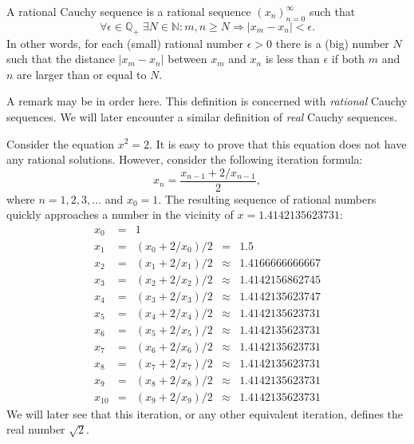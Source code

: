 \documentclass[11pt]{linearbook}
\begin{document}
\begin{definition}
  \label{th:rationalcauchysequence}
  A rational Cauchy sequence is a rational sequence
  $(x_n)_{n=0}^{\infty}$ such that
  \begin{equation}
    \forall \epsilon \in \mathbb{Q}_+ \;
    \exists N \in \mathbb{N} : m, n \geq N \Rightarrow |x_m - x_n| < \epsilon.
  \end{equation}
  In other words, for each (small) rational number $\epsilon > 0$
  there is a (big) number $N$ such that the distance $|x_m - x_n|$
  between $x_m$ and $x_n$ is less than $\epsilon$ if both $m$ and $n$
  are larger than or equal to $N$.
\end{definition}

\begin{remark}
  A remark may be in order here. This definition is concerned with
  \emph{rational} Cauchy sequences. We will later encounter a similar
  definition of \emph{real} Cauchy sequences.
\end{remark}

\begin{example}[Solving the equation $x^2 = 2$]
  Consider the equation $x^2 = 2$. It is easy to prove that this
  equation does not have any rational solutions. However, consider
  the following iteration formula:
  \begin{equation}
    x_n = \frac{x_{n-1} + 2 / x_{n - 1}}{2},
  \end{equation}
  where $n = 1,2,3,\ldots$ and $x_0 = 1$. The resulting sequence of
  rational numbers quickly approaches a number in the vicinity of
  $x = 1.4142135623731$:
  \begin{displaymath}
    \begin{array}{rclcl}
      x_0 &=& 1 \\
      x_{1} &=& (x_{0} + 2 / x_{0}) / 2 &=& 1.5 \\
      x_{2} &=& (x_{1} + 2 / x_{1}) / 2 &\approx& 1.4166666666667 \\
      x_{3} &=& (x_{2} + 2 / x_{2}) / 2 &\approx& 1.4142156862745 \\
      x_{4} &=& (x_{3} + 2 / x_{3}) / 2 &\approx& 1.4142135623747 \\
      x_{5} &=& (x_{4} + 2 / x_{4}) / 2 &\approx& 1.4142135623731 \\
      x_{6} &=& (x_{5} + 2 / x_{5}) / 2 &\approx& 1.4142135623731 \\
      x_{7} &=& (x_{6} + 2 / x_{6}) / 2 &\approx& 1.4142135623731 \\
      x_{8} &=& (x_{7} + 2 / x_{7}) / 2 &\approx& 1.4142135623731 \\
      x_{9} &=& (x_{8} + 2 / x_{8}) / 2 &\approx& 1.4142135623731 \\
      x_{10} &=& (x_{9} + 2 / x_{9}) / 2 &\approx& 1.4142135623731
    \end{array}
  \end{displaymath}
  We will later see that this iteration, or any other equivalent
  iteration, defines the real number $\sqrt{2}$.
\end{example}
\end{document}
